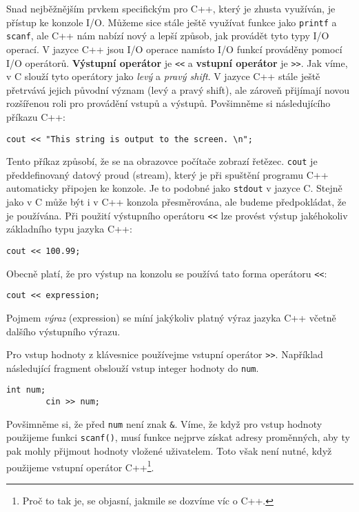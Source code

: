       Snad nejběžnějším prvkem specifickým pro C++, který je zhusta využíván, je přístup ke konzole
      I/O. Můžeme sice stále ještě využívat funkce jako \lstinline[style=luaCPPText]!printf! a
      \lstinline[style=luaCPPText]!scanf!, ale C++ nám nabízí nový a lepší způsob, jak provádět tyto
      typy I/O operací. V jazyce C++ jsou I/O operace namísto I/O funkcí prováděny pomocí I/O
      operátorů. \textbf{Výstupní operátor} je \lstinline[style=luaCPPText]!<<! a \textbf{vstupní
      operátor} je \lstinline[style=luaCPPText]!>>!. Jak víme, v C slouží tyto operátory jako
      \emph{levý} a \emph{pravý shift}. V jazyce C++ stále ještě přetrvává jejich původní význam
      (levý a pravý shift), ale zároveň přijímají novou rozšířenou roli pro provádění vstupů a
      výstupů. Povšimněme si následujícího příkazu C++:
      \begin{lstlisting}[style=luaCPPStyle]
        cout << "This string is output to the screen. \n";
      \end{lstlisting}
      Tento příkaz způsobí, že se na obrazovce počítače zobrazí řetězec.
      \lstinline[style=luaCPPText]!cout! je předdefinovaný datový proud (stream), který je při
      spuštění programu C++ automaticky připojen ke konzole. Je to podobné jako
      \lstinline[style=luaCPPText]!stdout! v jazyce C. Stejně jako v C může být i v C++ konzola
      přesměrována, ale budeme předpokládat, že je používána. Při použití výstupního operátoru
      \lstinline[style=luaCPPText]!<<! lze provést výstup jakéhokoliv základního typu jazyka C++:
      \begin{lstlisting}[style=luaCPPStyle]
        cout << 100.99;
      \end{lstlisting}
      Obecně platí, že pro výstup na konzolu se používá tato forma operátoru
      \lstinline[style=luaCPPText]!<<!:
      \begin{lstlisting}[style=luaCPPStyle]
        cout << expression; 
      \end{lstlisting}
      Pojmem \emph{výraz} (expression) se míní jakýkoliv platný výraz jazyka C++ včetně dalšího
      výstupního výrazu.

      Pro vstup hodnoty z klávesnice používejme vstupní operátor \lstinline[style=luaCPPText]!>>!.
      Například následující fragment obslouží vstup integer hodnoty do
      \lstinline[style=luaCPPText]!num!.
      \begin{lstlisting}[style=luaCPPStyle]
        int num; 
        cin >> num; 
      \end{lstlisting}
      Povšimněme si, že před \lstinline[style=luaCPPText]!num! není znak
      \lstinline[style=luaCPPText]!&!. Víme, že když pro vstup hodnoty použijeme  
      funkci \lstinline[style=luaCPPText]!scanf()!, musí funkce nejprve získat adresy proměnných,
      aby ty pak mohly přijmout hodnoty vložené uživatelem. Toto však není nutné, když použijeme
      vstupní operátor C++\footnote{Proč to tak je, se objasní, jakmile se dozvíme víc o C++.}.  
      
